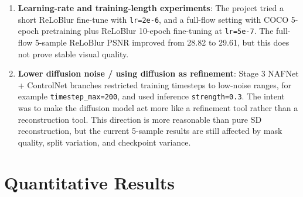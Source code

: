 \documentclass[11pt]{article}
\begin{document}
\begin{enumerate}[label=\arabic*., leftmargin=*]
  \item \textbf{Learning-rate and training-length experiments}: The project tried a short ReLoBlur fine-tune with \texttt{lr=2e-6}, and a full-flow setting with COCO 5-epoch pretraining plus ReLoBlur 10-epoch fine-tuning at \texttt{lr=5e-7}.
    The full-flow 5-sample ReLoBlur PSNR improved from 28.82 to 29.61, but this does not prove stable visual quality.

  \item \textbf{Lower diffusion noise / using diffusion as refinement}: Stage 3 NAFNet + ControlNet branches restricted training timesteps to low-noise ranges, for example \texttt{timestep\_max=200}, and used inference \texttt{strength=0.3}.
    The intent was to make the diffusion model act more like a refinement tool rather than a reconstruction tool.
    This direction is more reasonable than pure SD reconstruction, but the current 5-sample results are still affected by mask quality, split variation, and checkpoint variance.
\end{enumerate}

\section{Quantitative Results}
\end{document}

